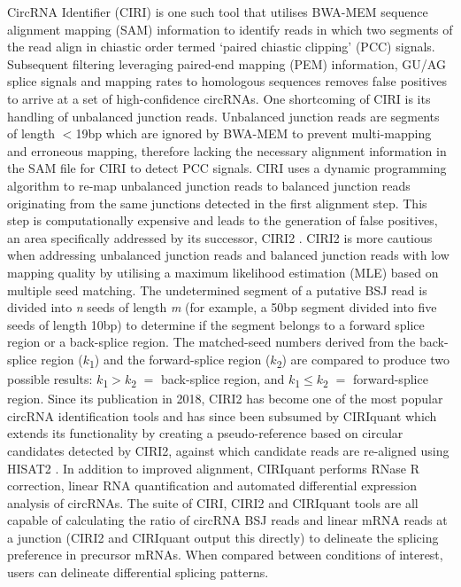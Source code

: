 CircRNA Identifier (CIRI) \cite{CIRI} is one such tool that utilises BWA-MEM sequence alignment mapping (SAM) information to identify reads in which two segments of the read align in chiastic order termed `paired chiastic clipping' (PCC) signals. Subsequent filtering leveraging paired-end mapping (PEM) information, GU/AG splice signals and mapping rates to homologous sequences removes false positives to arrive at a set of high-confidence circRNAs. One shortcoming of CIRI is its handling of unbalanced junction reads. Unbalanced junction reads are segments of length $<$19bp which are ignored by BWA-MEM to prevent multi-mapping and erroneous mapping, therefore lacking the necessary alignment information in the SAM file for CIRI to detect PCC signals. CIRI uses a dynamic programming algorithm to re-map unbalanced junction reads to balanced junction reads originating from the same junctions detected in the first alignment step. This step is computationally expensive and leads to the generation of false positives, an area specifically addressed by its successor, CIRI2 \cite{CIRI2}. CIRI2 is more cautious when addressing unbalanced junction reads and balanced junction reads with low mapping quality by utilising a maximum likelihood estimation (MLE) based on multiple seed matching. The undetermined segment of a putative BSJ read is divided into \textit{n} seeds of length \textit{m} (for example, a 50bp segment divided into five seeds of length 10bp) to determine if the segment belongs to a forward splice region or a back-splice region. The matched-seed numbers derived from the back-splice region ($k$\textsubscript{1}) and the forward-splice region ($k$\textsubscript{2}) are compared to produce two possible results: $k$\textsubscript{1}$>$$k$\textsubscript{2} $=$ back-splice region, and $k$\textsubscript{1}$\leq$$k$\textsubscript{2} $=$ forward-splice region. Since its publication in 2018, CIRI2 has become one of the most popular circRNA identification tools and has since been subsumed by CIRIquant \cite{CIRIquant} which extends its functionality by creating a pseudo-reference based on circular candidates detected by CIRI2, against which candidate reads are re-aligned using HISAT2 \cite{Kim2019Aug}. In addition to improved alignment, CIRIquant performs RNase R correction, linear RNA quantification and automated differential expression analysis of circRNAs. The suite of CIRI, CIRI2 and CIRIquant tools are all capable of calculating the ratio of circRNA BSJ reads and linear mRNA reads at a junction (CIRI2 and CIRIquant output this directly) to delineate the splicing preference in precursor mRNAs. When compared between conditions of interest, users can delineate differential splicing patterns. \par
